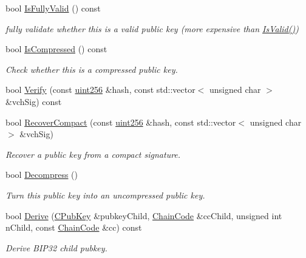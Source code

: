 \begin{DoxyCompactItemize}
\item 
bool \mbox{\hyperlink{class_c_pub_key_a69d8d49962240a5696410229dd83c93e}{Is\+Fully\+Valid}} () const
\begin{DoxyCompactList}\small\item\em fully validate whether this is a valid public key (more expensive than \mbox{\hyperlink{class_c_pub_key_a4fa94293cf8577fd039b9a133f6c7f30}{Is\+Valid()}}) \end{DoxyCompactList}\item 
bool \mbox{\hyperlink{class_c_pub_key_a25f8b70340ad20ddab0f80ec4cee9396}{Is\+Compressed}} () const
\begin{DoxyCompactList}\small\item\em Check whether this is a compressed public key. \end{DoxyCompactList}\item 
bool \mbox{\hyperlink{class_c_pub_key_a5b3fef213b227394ca9d0a1e3baa957e}{Verify}} (const \mbox{\hyperlink{classuint256}{uint256}} \&hash, const std\+::vector$<$ unsigned char $>$ \&vch\+Sig) const
\item 
bool \mbox{\hyperlink{class_c_pub_key_a169505e735a02db385486b0affeb565c}{Recover\+Compact}} (const \mbox{\hyperlink{classuint256}{uint256}} \&hash, const std\+::vector$<$ unsigned char $>$ \&vch\+Sig)
\begin{DoxyCompactList}\small\item\em Recover a public key from a compact signature. \end{DoxyCompactList}\item 
bool \mbox{\hyperlink{class_c_pub_key_a572689418fecf47b300a11519bc3da36}{Decompress}} ()
\begin{DoxyCompactList}\small\item\em Turn this public key into an uncompressed public key. \end{DoxyCompactList}\item 
bool \mbox{\hyperlink{class_c_pub_key_ac28722f47ab8a613bf9982608d13aa1f}{Derive}} (\mbox{\hyperlink{class_c_pub_key}{C\+Pub\+Key}} \&pubkey\+Child, \mbox{\hyperlink{hash_8h_aa201a9867f780a040c7af908e0a85db3}{Chain\+Code}} \&cc\+Child, unsigned int n\+Child, const \mbox{\hyperlink{hash_8h_aa201a9867f780a040c7af908e0a85db3}{Chain\+Code}} \&cc) const
\begin{DoxyCompactList}\small\item\em Derive B\+I\+P32 child pubkey. \end{DoxyCompactList}\end{DoxyCompactItemize}
